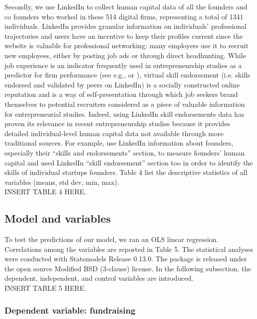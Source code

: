 \documentclass[12pt]{article}
\begin{document}
Secondly, we use LinkedIn to collect human capital data of all the founders and co founders who worked in these 514 digital firms, representing a total of 1341 individuals. LinkedIn provides granular information on individuals’ professional trajectories and users have an incentive to keep their profiles current since the website is valuable for professional networking: many employers use it to recruit new employees, either by posting job ads or through direct headhunting. While job experience is an indicator frequently used in entrepreneurship studies as a predictor for firm performance (see e.g., \citet{colombo2005founders} or \citet{delmar2006does}), virtual skill endorsement (i.e. skills endorsed and validated by peers on LinkedIn) is a socially constructed online reputation and is a way of self-presentation through which job seekers brand themselves to potential recruiters \citep{rapanta2017linkedin} considered as a piece of valuable information for entrepreneurial studies. Indeed, using LinkedIn skill endorsements data has proven its relevance in recent entrepreneurship studies because it provides detailed individual-level human capital data not available through more traditional sources. For example, \citet{reese2020should} use LinkedIn information about founders, especially their “skills and endorsements” section, to measure founders’ human capital and \citet{sako2020scaling} used LinkedIn “skill endorsement” section too in order to identify the skills of individual startups founders. Table 4 list the descriptive statistics of all variables (means, std dev, min, max). \\

INSERT TABLE 4 HERE.

\subsection{Model and variables}

To test the predictions of our model, we ran an OLS linear regression. Correlations among the variables are reported in Table 5\label{table5}. The statistical analyses were conducted with Statsmodels Release 0.13.0. The package is released under the open source Modified BSD (3-clause) license. In the following subsection, the dependent, independent, and control variables are introduced. \\

INSERT TABLE 5 HERE.

\subsubsection{Dependent variable: fundraising}
\end{document}
